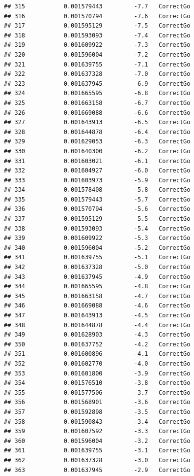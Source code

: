 \documentclass[
]{article}
\begin{document}
\begin{verbatim}
## 315           0.001579443         -7.7   CorrectGo
## 316           0.001570794         -7.6   CorrectGo
## 317           0.001595129         -7.5   CorrectGo
## 318           0.001593093         -7.4   CorrectGo
## 319           0.001609922         -7.3   CorrectGo
## 320           0.001596004         -7.2   CorrectGo
## 321           0.001639755         -7.1   CorrectGo
## 322           0.001637328         -7.0   CorrectGo
## 323           0.001637945         -6.9   CorrectGo
## 324           0.001665595         -6.8   CorrectGo
## 325           0.001663158         -6.7   CorrectGo
## 326           0.001669088         -6.6   CorrectGo
## 327           0.001643913         -6.5   CorrectGo
## 328           0.001644878         -6.4   CorrectGo
## 329           0.001629053         -6.3   CorrectGo
## 330           0.001640300         -6.2   CorrectGo
## 331           0.001603021         -6.1   CorrectGo
## 332           0.001604927         -6.0   CorrectGo
## 333           0.001603973         -5.9   CorrectGo
## 334           0.001578408         -5.8   CorrectGo
## 335           0.001579443         -5.7   CorrectGo
## 336           0.001570794         -5.6   CorrectGo
## 337           0.001595129         -5.5   CorrectGo
## 338           0.001593093         -5.4   CorrectGo
## 339           0.001609922         -5.3   CorrectGo
## 340           0.001596004         -5.2   CorrectGo
## 341           0.001639755         -5.1   CorrectGo
## 342           0.001637328         -5.0   CorrectGo
## 343           0.001637945         -4.9   CorrectGo
## 344           0.001665595         -4.8   CorrectGo
## 345           0.001663158         -4.7   CorrectGo
## 346           0.001669088         -4.6   CorrectGo
## 347           0.001643913         -4.5   CorrectGo
## 348           0.001644878         -4.4   CorrectGo
## 349           0.001628903         -4.3   CorrectGo
## 350           0.001637752         -4.2   CorrectGo
## 351           0.001600896         -4.1   CorrectGo
## 352           0.001602770         -4.0   CorrectGo
## 353           0.001601800         -3.9   CorrectGo
## 354           0.001576510         -3.8   CorrectGo
## 355           0.001577506         -3.7   CorrectGo
## 356           0.001568901         -3.6   CorrectGo
## 357           0.001592898         -3.5   CorrectGo
## 358           0.001590843         -3.4   CorrectGo
## 359           0.001607592         -3.3   CorrectGo
## 360           0.001596004         -3.2   CorrectGo
## 361           0.001639755         -3.1   CorrectGo
## 362           0.001637328         -3.0   CorrectGo
## 363           0.001637945         -2.9   CorrectGo

\end{verbatim}
\end{document}
